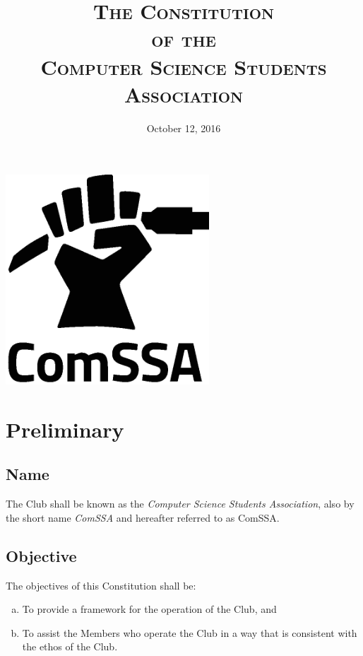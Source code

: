 \documentclass[a4paper,12pt]{article}
\title{\scshape
	The Constitution\\
	of the\\
	Computer Science Students Association
}
\date{October 12, 2016}
\author{} %
\begin{document}
\maketitle

\vspace{1in}

\begin{center}
	\includegraphics[width=3in]{logo/delan/comssalogo_crop_black.eps}
\end{center}

\newpage


\section{Preliminary}

\subsection{Name}

The Club shall be known as the \textit{Computer Science Students Association}, also by the short name \textit{ComSSA} and hereafter referred to as ComSSA.

\subsection{Objective}

The objectives of this Constitution shall be:

\begin{enumerate}[a)]
	\item To provide a framework for the operation of the Club, and
	\item To assist the Members who operate the Club in a way that is consistent with the ethos of the Club.
\end{enumerate}
\end{document}
